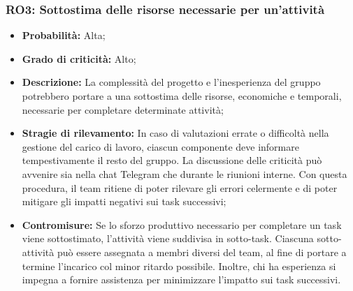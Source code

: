 \subsubsection{RO3: Sottostima delle risorse necessarie per un'attività}
\begin{itemize}
    \item \textbf{Probabilità:} Alta;
    \item \textbf{Grado di criticità:} Alto;
    \item \textbf{Descrizione:} La complessità del progetto e l'inesperienza del gruppo potrebbero portare a una sottostima delle risorse, economiche e temporali, necessarie per completare determinate attività;
    \item \textbf{Stragie di rilevamento:} In caso di valutazioni errate o difficoltà nella gestione del carico di lavoro, ciascun componente deve informare tempestivamente il resto del gruppo. La discussione delle criticità può avvenire sia nella chat Telegram che durante le riunioni interne. Con questa procedura, il team ritiene di poter rilevare gli errori celermente e di poter mitigare gli impatti negativi sui task successivi;
    \item \textbf{Contromisure:} Se lo sforzo produttivo necessario per completare un task viene sottostimato, l'attività viene suddivisa in sotto-task. Ciascuna sotto-attività può essere assegnata a membri diversi del team, al fine di portare a termine l’incarico col minor ritardo possibile. Inoltre, chi ha esperienza si impegna a fornire assistenza per minimizzare l'impatto sui task successivi.
\end{itemize}
